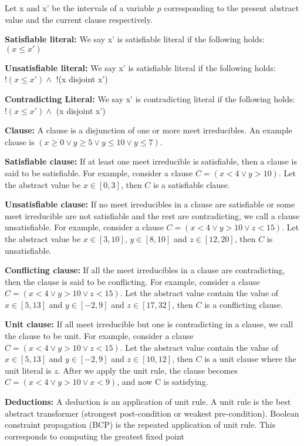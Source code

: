 \documentclass{article}
\begin{document}
Let x and x' be the intervals of a variable $p$ corresponding
to the present abstract value and the current clause respectively. 

\textbf{Satisfiable literal:} 
We say x' is satisfiable literal if the following holds: \\
$(x \leq x')$

\textbf{Unsatisfiable literal:}
We say x' is satisfiable literal if the following holds: \\
$!(x \leq x') \wedge$ $!$(x disjoint x')

\textbf{Contradicting Literal:}
We say x' is contradicting literal if the following holds: \\
$!(x \leq x') \wedge$ (x disjoint x')

\textbf{Clause:} A clause is a disjunction of one or more meet irreducibles. An 
example clause is $(x \geq 0 \vee y \geq 5 \vee y \leq 10 \vee y \leq 7)$.

\textbf{Satisfiable clause:}
If at least one meet irreducible is satisfiable, then a clause is said to 
be satisfiable. For example, consider a clause $C=(x<4 \vee y>10)$. Let the 
abstract value be $x \in [0,3]$, then $C$ is a satisfiable clause. 
 
\textbf{Unsatisfiable clause:}
If no meet irreducibles in a clause are satisfiable or some meet
irreducible are not satisfiable and the rest are contradicting, we call a 
clause unsatisfiable. For example, consider a clause $C=(x<4 \vee y>10 \vee z<15)$. 
Let the abstract value be $x \in [3,10]$, $y \in [8,10]$ and $z \in [12,20]$, 
then $C$ is unsatisfiable. 

\textbf{Conflicting clause:}
If all the meet irreducibles in a clause are contradicting, then the clause is said to
be conflicting. For example, consider a clause $C=(x<4 \vee y>10 \vee z<15)$. Let the 
abstract value contain the value of $x \in [5,13]$ and $y \in [-2,9]$ and $z \in
[17,32]$, then $C$ is a conflicting clause.

\textbf{Unit clause:}
If all meet irreducible but one is contradicting in a clause, we call the clause
to be unit. For example, consider a clause $C=(x<4 \vee y>10 \vee z<15)$. Let the 
abstract value contain the value of $x \in [5,13]$ and $y \in [-2,9]$ and $z \in
[10,12]$, then $C$ is a unit clause where the unit literal is $z$. 
After we apply the unit rule, the clause becomes $C=(x<4 \vee y>10 \vee x < 9)$, 
and now C is satisfying.

\textbf{Deductions:} A deduction is an application of unit rule. A 
unit rule is the best abstract transformer (strongest post-condition or 
weakest pre-condition). Boolean constraint propagation (BCP) is the 
repeated application of unit rule. This corresponds to computing the 
greatest fixed point
\end{document}
